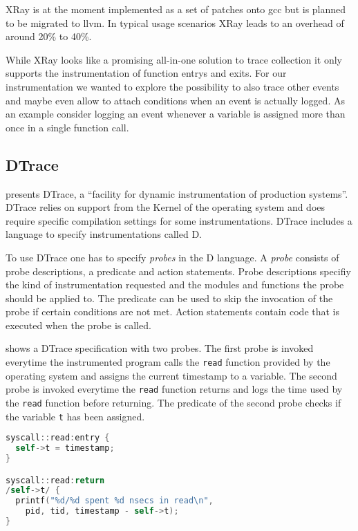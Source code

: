 XRay is at the moment implemented as a set of patches onto \gls{gcc} but is planned to be migrated to \gls{llvm}.
In typical usage scenarios XRay leads to an overhead of around 20\% to 40\%.

While XRay looks like a promising all-in-one solution to trace collection it only supports the instrumentation of function entrys and exits.
For our instrumentation we wanted to explore the possibility to also trace other events and maybe even allow to attach conditions when an event is actually logged.
As an example consider logging an event whenever a variable is assigned more than once in a single function call.

\subsection{DTrace}

\Cite{Cantrill2004} presents DTrace, a ``facility for dynamic instrumentation of production systems''.
DTrace relies on support from the Kernel of the operating system and does require specific compilation settings for some instrumentations.
DTrace includes a language to specify instrumentations called D.

To use DTrace one has to specify \emph{probes} in the D language.
A \emph{probe} consists of probe descriptions, a predicate and action statements.
Probe descriptions specifiy the kind of instrumentation requested and the modules and functions the probe should be applied to.
The predicate can be used to skip the invocation of the probe if certain conditions are not met.
Action statements contain code that is executed when the probe is called.

 shows a DTrace specification with two probes.
The first probe is invoked everytime the instrumented program calls the \lstinline{read} function provided by the operating system and assigns the current timestamp to a variable.
The second probe is invoked everytime the \lstinline{read} function returns and logs the time used by the \lstinline{read} function before returning.
The predicate of the second probe checks if the variable \lstinline{t} has been assigned.

\begin{lstlisting}[showstringspaces=false,language=C,float,label=listing:dtrace_spec, caption={A DTrace specification in the D language specifying two probes}]
syscall::read:entry {
  self->t = timestamp;
}

syscall::read:return
/self->t/ {
  printf("%d/%d spent %d nsecs in read\n",
    pid, tid, timestamp - self->t);
}
\end{lstlisting}


